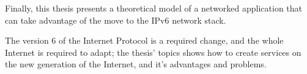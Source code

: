 Finally, this thesis  presents a theoretical model of a networked application that can take advantage of the move to the IPv6 network stack. 

The version 6 of the Internet Protocol is a required change, and the whole Internet is required to adapt; the thesis' topics shows how to create services on the new generation of the Internet, and it's advantages and problems.

\clearpage


\tableofcontents

\listoffigures

\listoftables

\clearpage


